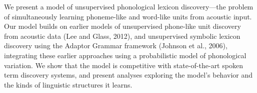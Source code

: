 We present a model of unsupervised phonological lexicon discovery—the problem of simultaneously learning phoneme-like and word-like units from acoustic input. Our model builds on earlier models of unsupervised phone-like unit discovery from acoustic data (Lee and Glass, 2012), and unsupervised symbolic lexicon discovery using the Adaptor Grammar framework (Johnson et al., 2006), integrating these earlier approaches using a probabilistic model of phonological variation. We show that the model is competitive with state-of-the-art spoken term discovery systems, and present analyses exploring the model's behavior and the kinds of linguistic structures it learns.
